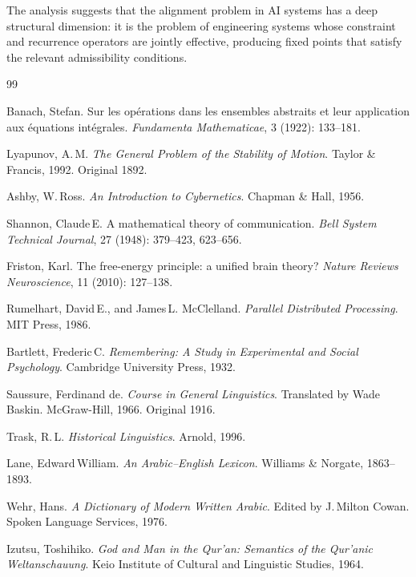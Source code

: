 \documentclass[12pt, oneside]{article}
\theoremstyle{definition}
\theoremstyle{remark}
\begin{document}
The analysis suggests that the alignment problem in AI systems has a deep structural dimension: it is the problem of engineering systems whose constraint and recurrence operators are jointly effective, producing fixed points that satisfy the relevant admissibility conditions.

\newpage
\begin{thebibliography}{99}

Banach, Stefan.
\newblock Sur les op\'erations dans les ensembles abstraits et leur application aux \'equations int\'egrales.
\newblock \textit{Fundamenta Mathematicae}, 3 (1922): 133--181.

Lyapunov, A.\,M.
\newblock \textit{The General Problem of the Stability of Motion}.
\newblock Taylor \& Francis, 1992. Original 1892.

Ashby, W.\,Ross.
\newblock \textit{An Introduction to Cybernetics}.
\newblock Chapman \& Hall, 1956.

Shannon, Claude\,E.
\newblock A mathematical theory of communication.
\newblock \textit{Bell System Technical Journal}, 27 (1948): 379--423, 623--656.

Friston, Karl.
\newblock The free-energy principle: a unified brain theory?
\newblock \textit{Nature Reviews Neuroscience}, 11 (2010): 127--138.

Rumelhart, David\,E., and James\,L. McClelland.
\newblock \textit{Parallel Distributed Processing}.
\newblock MIT Press, 1986.

Bartlett, Frederic\,C.
\newblock \textit{Remembering: A Study in Experimental and Social Psychology}.
\newblock Cambridge University Press, 1932.

Saussure, Ferdinand de.
\newblock \textit{Course in General Linguistics}.
\newblock Translated by Wade Baskin. McGraw-Hill, 1966. Original 1916.

Trask, R.\,L.
\newblock \textit{Historical Linguistics}.
\newblock Arnold, 1996.

Lane, Edward\,William.
\newblock \textit{An Arabic--English Lexicon}.
\newblock Williams \& Norgate, 1863--1893.

Wehr, Hans.
\newblock \textit{A Dictionary of Modern Written Arabic}.
\newblock Edited by J.\,Milton Cowan. Spoken Language Services, 1976.

Izutsu, Toshihiko.
\newblock \textit{God and Man in the Qur'an: Semantics of the Qur'anic Weltanschauung}.
\newblock Keio Institute of Cultural and Linguistic Studies, 1964.


\end{thebibliography}
\end{document}

